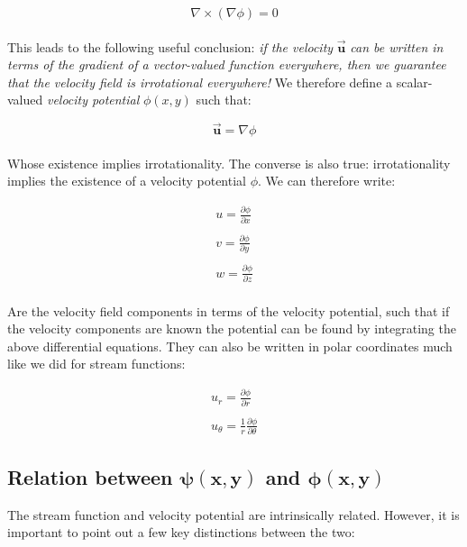 \documentclass[11pt]{article}
\begin{document}
\begin{equation*}
    \nabla \times (\nabla\phi) = 0
\end{equation*}\\
\noindent
This leads to the following useful conclusion: \emph{if the velocity} $\vec{\bm{u}}$ \emph{can be written in terms of the gradient of a vector-valued function everywhere, then we guarantee that the velocity field is irrotational everywhere!} We therefore define a scalar-valued \emph{velocity potential} $\phi(x,y)$ such that:

\begin{equation}\label{velocitypotential}
    \vec{\bm{u}} = \nabla \phi
\end{equation}\\
\noindent
Whose existence implies irrotationality. The converse is also true: irrotationality implies the existence of a velocity potential $\phi$. We can therefore write:

\begin{equation*}
    \begin{matrix}
        u = \frac{\partial \phi}{\partial x} \\ \\
        v = \frac{\partial \phi}{\partial y} \\ \\
        w = \frac{\partial \phi}{\partial z}
    \end{matrix}
\end{equation*}\\
\noindent
Are the velocity field components in terms of the velocity potential, such that if the velocity components are known the potential can be found by integrating the above differential equations. They can also be written in polar coordinates much like we did for stream functions:

\begin{equation*}
    \begin{matrix}
        u_r = \frac{\partial \phi}{\partial r} \\ \\
        u_\theta = \frac{1}{r}\frac{\partial \phi}{\partial \theta}
    \end{matrix}
\end{equation*}

\subsection{Relation between $\bm{\psi(x,y)}$ and $\bm{\phi(x,y)}$}
The stream function and velocity potential are intrinsically related. However, it is important to point out a few key distinctions between the two:
\end{document}
